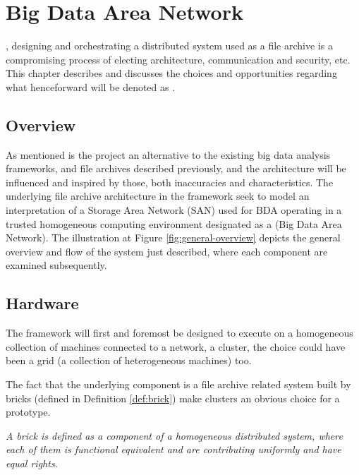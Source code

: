 \chapter{Big Data Area Network}

, designing and orchestrating a distributed system used as a file archive is a compromising process of electing architecture, communication and security, etc. This chapter describes and discusses the choices and opportunities regarding what henceforward will be denoted as \CodeNameFull. 

\section{Overview}

As mentioned is the project an alternative to the existing big data analysis frameworks, and file archives described previously, and the architecture will be influenced and inspired by those, both inaccuracies and characteristics. The underlying file archive architecture in the framework seek to model an interpretation of a Storage Area Network (SAN) used for BDA operating in a trusted homogeneous computing environment designated as a \Network (Big Data Area Network). The illustration at Figure \ref{fig:general-overview} depicts the general overview and flow of the system just described, where each component are examined subsequently.

\section{Hardware}
The framework will first and foremost be designed to execute on a homogeneous collection of machines connected to a network, \ie a cluster, the choice could have been a grid (a collection of heterogeneous machines) too. 

The fact that the underlying component is a file archive related system built by bricks (defined in Definition \ref{def:brick}) make clusters an obvious choice for a prototype.

\vspace*{3mm}
\begin{definition}[Brick] \label{def:brick}
\textit{A brick is defined as a component of a homogeneous distributed system, where each of them is functional equivalent and are contributing uniformly and have equal rights.}
\end{definition}
\vspace*{3mm}

